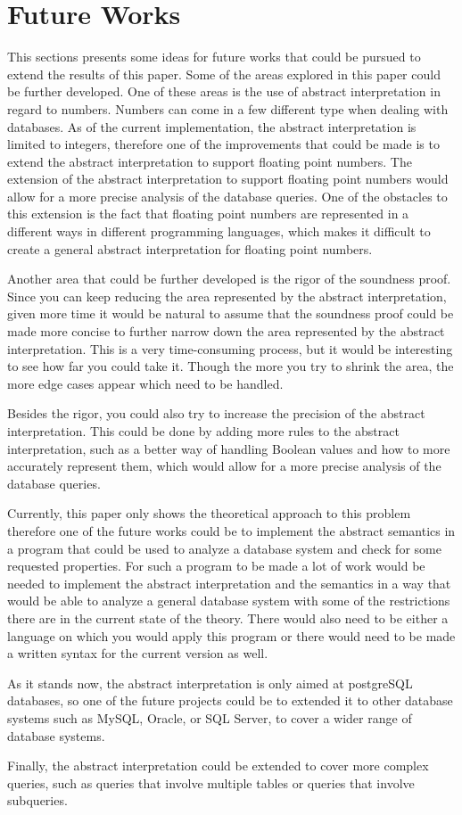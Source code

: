 \section{Future Works}\label{sec:future-works}
This sections presents some ideas for future works that could be pursued to extend the results of this paper.
Some of the areas explored in this paper could be further developed.
One of these areas is the use of abstract interpretation in regard to numbers.
Numbers can come in a few different type when dealing with databases.
As of the current implementation, the abstract interpretation is limited to integers, therefore one of the improvements that could be made is to extend the abstract interpretation to support floating point numbers.
The extension of the abstract interpretation to support floating point numbers would allow for a more precise analysis of the database queries.
One of the obstacles to this extension is the fact that floating point numbers are represented in a different ways in different programming languages, which makes it difficult to create a general abstract interpretation for floating point numbers.

Another area that could be further developed is the rigor of the soundness proof.
Since you can keep reducing the area represented by the abstract interpretation, given more time it would be natural to assume that the soundness proof could be made more concise to further narrow down the area represented by the abstract interpretation.
This is a very time-consuming process, but it would be interesting to see how far you could take it.
Though the more you try to shrink the area, the more edge cases appear which need to be handled.

Besides the rigor, you could also try to increase the precision of the abstract interpretation.
This could be done by adding more rules to the abstract interpretation, such as a better way of handling Boolean values and how to more accurately represent them, which would allow for a more precise analysis of the database queries.

Currently, this paper only shows the theoretical approach to this problem therefore one of the future works could be to implement the abstract semantics in a program that could be used to analyze a database system and check for some requested properties.
For such a program to be made a lot of work would be needed to implement the abstract interpretation and the semantics in a way that would be able to analyze a general database system with some of the restrictions there are in the current state of the theory.
There would also need to be either a language on which you would apply this program or there would need to be made a written syntax for the current version as well.

As it stands now, the abstract interpretation is only aimed at postgreSQL databases, so one of the future projects could be to extended it to other database systems such as MySQL, Oracle, or SQL Server, to cover a wider range of database systems.

Finally, the abstract interpretation could be extended to cover more complex queries, such as queries that involve multiple tables or queries that involve subqueries.